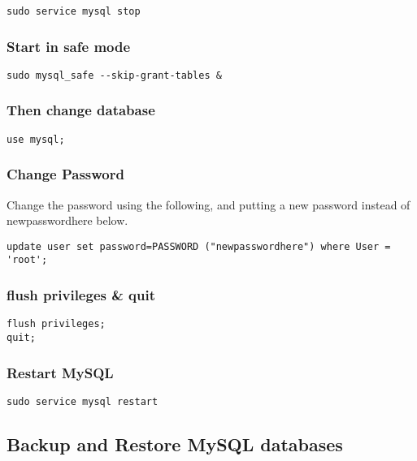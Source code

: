 \begin{lstlisting}
sudo service mysql stop
\end{lstlisting}

\subsubsection{Start in safe mode}

\begin{lstlisting}
sudo mysql_safe --skip-grant-tables &
\end{lstlisting}

\subsubsection{Then change database}

\begin{lstlisting}
use mysql;
\end{lstlisting}

\subsubsection{Change Password}

Change the password using the following, and putting a new password instead of newpasswordhere below.

\begin{lstlisting}
update user set password=PASSWORD ("newpasswordhere") where User = 'root';
\end{lstlisting}

\subsubsection{flush privileges \& quit}

\begin{lstlisting}
flush privileges;
quit;
\end{lstlisting}

\subsubsection{Restart MySQL}

\begin{lstlisting}
sudo service mysql restart
\end{lstlisting}

\subsection{Backup and Restore MySQL databases}
\label{ssec:mySQLBackup}

